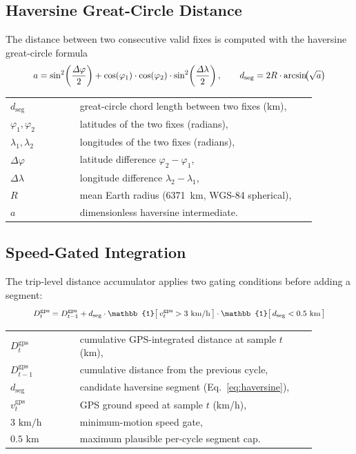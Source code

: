 \subsection{Haversine Great-Circle Distance}
\label{sec:gps_haversine}

The distance between two consecutive valid fixes is computed with the haversine great-circle formula
\begin{equation}
\resizebox{0.88\linewidth}{!}{$\displaystyle
a = \sin^{2}\!\left(\frac{\Delta\varphi}{2}\right) + \cos(\varphi_1)\cdot\cos(\varphi_2)\cdot\sin^{2}\!\left(\frac{\Delta\lambda}{2}\right), \qquad d_{\mathrm{seg}} = 2R\cdot\arcsin\!\bigl(\sqrt{a}\bigr)
$}
\label{eq:haversine}
\end{equation}
\noindent\begin{tabular}{@{}p{0.20\linewidth}@{\quad}p{0.68\linewidth}@{}}
$d_{\mathrm{seg}}$ & great-circle chord length between two fixes (km), \\
$\varphi_1, \varphi_2$ & latitudes of the two fixes (radians), \\
$\lambda_1, \lambda_2$ & longitudes of the two fixes (radians), \\
$\Delta\varphi$ & latitude difference $\varphi_2 - \varphi_1$, \\
$\Delta\lambda$ & longitude difference $\lambda_2 - \lambda_1$, \\
$R$ & mean Earth radius (6371~km, WGS-84 spherical), \\
$a$ & dimensionless haversine intermediate.
\end{tabular}

\subsection{Speed-Gated Integration}
\label{sec:gps_integration}

The trip-level distance accumulator applies two gating conditions before adding a segment:
\begin{equation}
\resizebox{0.88\linewidth}{!}{$\displaystyle
D^{\mathrm{gps}}_t = D^{\mathrm{gps}}_{t-1} + d_{\mathrm{seg}} \cdot \mathbb{1}\bigl[\,v^{\mathrm{gps}}_t > 3\text{ km/h}\,\bigr] \cdot \mathbb{1}\bigl[\,d_{\mathrm{seg}} < 0.5\text{ km}\,\bigr]
$}
\label{eq:gps_integration}
\end{equation}
\noindent\begin{tabular}{@{}p{0.20\linewidth}@{\quad}p{0.68\linewidth}@{}}
$D^{\mathrm{gps}}_t$ & cumulative GPS-integrated distance at sample $t$ (km), \\
$D^{\mathrm{gps}}_{t-1}$ & cumulative distance from the previous cycle, \\
$d_{\mathrm{seg}}$ & candidate haversine segment (Eq.~\ref{eq:haversine}), \\
$v^{\mathrm{gps}}_t$ & GPS ground speed at sample $t$ (km/h), \\
$3\text{ km/h}$ & minimum-motion speed gate, \\
$0.5\text{ km}$ & maximum plausible per-cycle segment cap.
\end{tabular}

